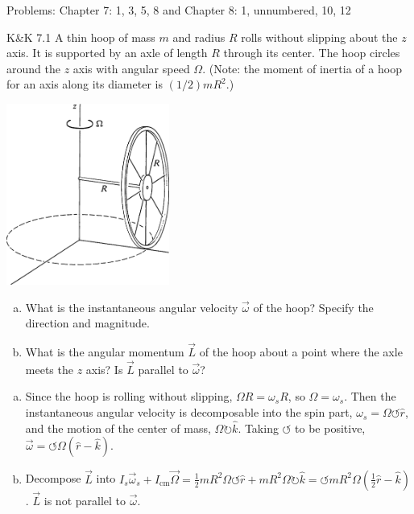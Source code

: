 \documentclass{esg8012pset}
\begin{document}
\noindent Problems: Chapter 7: 1, 3, 5, 8 and Chapter 8: 1, unnumbered, 10, 12

\begin{problem}{K\&K 7.1}
  A thin hoop of mass $m$ and radius $R$ rolls without slipping about the $z$ axis. It is supported by an axle of length $R$ through its center. The hoop circles around the $z$ axis with angular speed $\Omega$. (Note: the moment of inertia of a hoop for an axis along its diameter is $(1 / 2)mR^2$.)
  \begin{center}\includegraphics[width=0.4\textwidth]{ps11_1}\end{center}
  \begin{enumerate}[(a)]
    \item What is the instantaneous angular velocity $\vec \omega$ of the hoop? Specify the direction and magnitude.
    \item What is the angular momentum $\vec L$ of the hoop about a point where the axle meets the $z$ axis? Is $\vec L$ parallel to $\vec \omega$?
  \end{enumerate}
\end{problem}
\begin{solution}
\begin{enumerate}[(a)]
  \item Since the hoop is rolling without slipping, $\Omega R = \omega_s R$, so $\Omega = \omega_s$.  Then the instantaneous angular velocity is decomposable into the spin part, $\omega_s = \Omega \leftturn \hat r$, and the motion of the center of mass, $\Omega \rightturn\hat k$.  Taking $\leftturn$ to be positive, $\vec \omega = \leftturn\Omega(\hat r - \hat k)$.
  \item Decompose $\vec L$ into $I_s \vec \omega_s + I_\text{cm} \vec \Omega = \frac{1}{2} m R^2 \Omega \leftturn \hat r + m R^2 \Omega\rightturn \hat k = \leftturn mR^2 \Omega\left(\frac12 \hat r - \hat k\right)$.  $\vec L$ is not parallel to $\vec \omega$.
\end{enumerate}
\end{solution}
\end{document}
